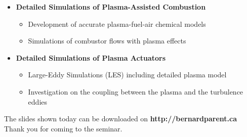 \documentclass{projector}
\begin{document}
\begin{slide}
\vfill
\begin{itemize}
\item {\bf Detailed Simulations of Plasma-Assisted Combustion}
      \begin{itemize}
        \item Development of accurate plasma-fuel-air chemical models
        \item Simulations of combustor flows with plasma effects 
      \end{itemize}
\vspace{0.8em}
\item {\bf Detailed Simulations of Plasma Actuators}
      \begin{itemize}
        \item Large-Eddy Simulations (LES) including detailed plasma model 
        \item Investigation on the coupling between the plasma and the turbulence eddies  
      \end{itemize}
 \vfill\vfill
\end{itemize}
\end{slide}







\begin{slide}
\centering
\vfill
{}
\end{slide}






\begin{slide}
\centering
\vfill\vfill\vfill
The slides shown today can be downloaded on
\vfill
{\bf http://bernardparent.ca}
\vfill
Thank you for coming to the seminar. 
\vfill\vfill\vfill
\end{slide}
\end{document}
